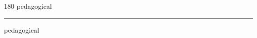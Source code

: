
\begin{frame}
\begin{center}
\begin{turn}{180}
{\fontsize{2.5cm}{1em}\selectfont pedagogical}
\end{turn}
\vspace{1em}\par  
\hrule
\vspace{1em}\par  
{\fontsize{2.5cm}{1em}\selectfont pedagogical}
\end{center}
\end{frame}
